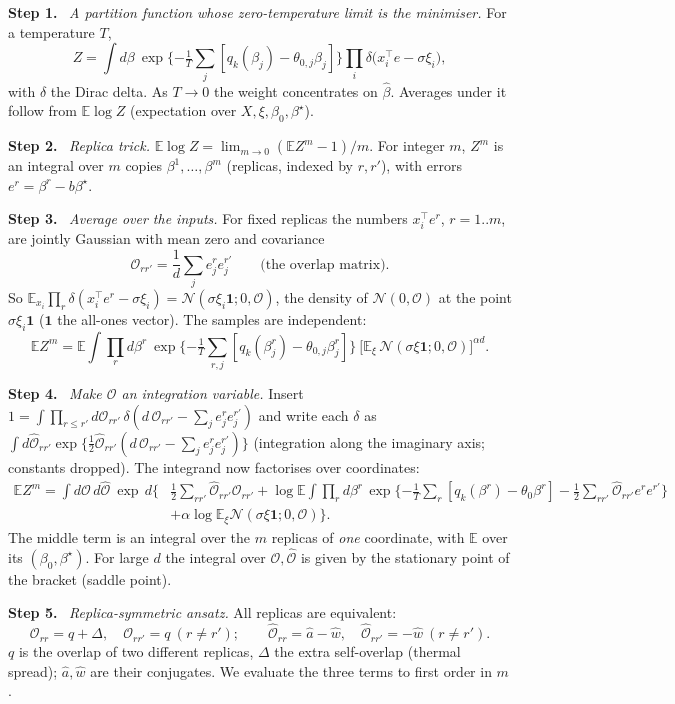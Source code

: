 \documentclass[10pt]{article}
\newcommand{\bs}{\beta^\star}\newcommand{\E}{\mathbb E}\newcommand{\asinh}{\operatorname{arcsinh}}\newcommand{\sk}{\sqrt k}
\newcommand{\step}[1]{\par\smallskip\textbf{Step #1.}\ }
\begin{document}
\step1 \emph{A partition function whose zero-temperature limit is the minimiser.} For a temperature $T$,
\[
Z=\int d\beta\ \exp\{-\tfrac1T\sum_j[q_k(\beta_j)-\theta_{0,j}\beta_j]\}\prod_i\delta\big(x_i^\top e-\sigma\xi_i\big),
\]
with $\delta$ the Dirac delta. As $T\to0$ the weight concentrates on $\hat\beta$. Averages under it follow from $\E\log Z$ (expectation over $X,\xi,\beta_0,\bs$).
\step2 \emph{Replica trick.} $\E\log Z=\lim_{m\to0}(\E Z^m-1)/m$. For integer $m$, $Z^m$ is an integral over $m$ copies $\beta^1,\dots,\beta^m$ (replicas, indexed by $r,r'$), with errors $e^r=\beta^r-b\bs$.
\step3 \emph{Average over the inputs.} For fixed replicas the numbers $x_i^\top e^r$, $r=1..m$, are jointly Gaussian with mean zero and covariance
\[
\mathcal O_{rr'}=\frac1d\sum_je^r_je^{r'}_j\qquad\text{(the overlap matrix).}
\]
So $\E_{x_i}\prod_r\delta(x_i^\top e^r-\sigma\xi_i)=\mathcal N(\sigma\xi_i\mathbf 1;0,\mathcal O)$, the density of $\mathcal N(0,\mathcal O)$ at the point $\sigma\xi_i\mathbf 1$ ($\mathbf 1$ the all-ones vector). The samples are independent:
\[
\E Z^m=\E\int\prod_rd\beta^r\ \exp\{-\tfrac1T\sum_{r,j}[q_k(\beta^r_j)-\theta_{0,j}\beta^r_j]\}\ \Big[\E_\xi\,\mathcal N(\sigma\xi\mathbf 1;0,\mathcal O)\Big]^{\alpha d}.
\]
\step4 \emph{Make $\mathcal O$ an integration variable.} Insert $1=\int\prod_{r\le r'}d\mathcal O_{rr'}\,\delta(d\,\mathcal O_{rr'}-\sum_je^r_je^{r'}_j)$ and write each $\delta$ as $\int d\hat{\mathcal O}_{rr'}\exp\{\frac12\hat{\mathcal O}_{rr'}(d\,\mathcal O_{rr'}-\sum_je^r_je^{r'}_j)\}$ (integration along the imaginary axis; constants dropped). The integrand now factorises over coordinates:
\[
\begin{aligned}\E Z^m=\int d\mathcal O\,d\hat{\mathcal O}\ \exp\,d\Big\{&\tfrac12\sum_{rr'}\hat{\mathcal O}_{rr'}\mathcal O_{rr'}+\log\E\!\int\prod_rd\beta^r\,\exp\{-\tfrac1T\sum_r[q_k(\beta^r)-\theta_0\beta^r]-\tfrac12\sum_{rr'}\hat{\mathcal O}_{rr'}e^re^{r'}\}\\&+\alpha\log\E_\xi\mathcal N(\sigma\xi\mathbf 1;0,\mathcal O)\Big\}.\end{aligned}
\]
The middle term is an integral over the $m$ replicas of \emph{one} coordinate, with $\E$ over its $(\beta_0,\bs)$. For large $d$ the integral over $\mathcal O,\hat{\mathcal O}$ is given by the stationary point of the bracket (saddle point).
\step5 \emph{Replica-symmetric ansatz.} All replicas are equivalent:
\[
\mathcal O_{rr}=q+\Delta,\quad\mathcal O_{rr'}=q\ (r\neq r');\qquad\hat{\mathcal O}_{rr}=\hat a-\hat w,\quad\hat{\mathcal O}_{rr'}=-\hat w\ (r\neq r').
\]
$q$ is the overlap of two different replicas, $\Delta$ the extra self-overlap (thermal spread); $\hat a,\hat w$ are their conjugates. We evaluate the three terms to first order in $m$.
\end{document}
